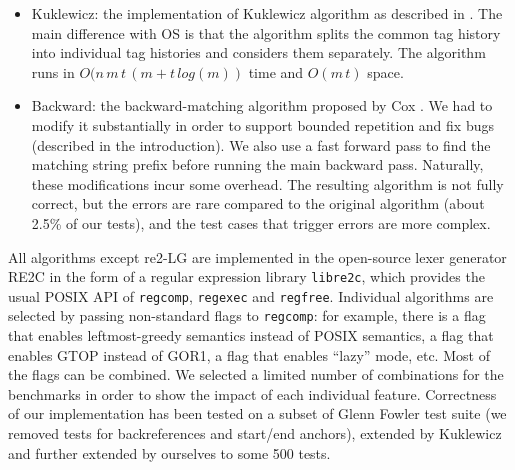 \documentclass[AMA,STIX1COL]{WileyNJD-v2}
\begin{document}
\begin{itemize}[itemsep=0.2em, topsep=0.5em]
\item Kuklewicz: the implementation of Kuklewicz algorithm \cite{Kuk07} as described in \cite{Tro17}.
    The main difference with OS is that the algorithm splits the common tag history into individual tag histories and considers them separately.
    The algorithm runs in $O(n \, m \, t \, (m + t \, log(m))$ time and $O(m \, t)$ space.

\item Backward: the backward-matching algorithm proposed by Cox \cite{Cox09}.
    We had to modify it substantially in order to support bounded repetition and fix bugs (described in the introduction).
    We also use a fast forward pass to find the matching string prefix before running the main backward pass.
    Naturally, these modifications incur some overhead.
    The resulting algorithm is not fully correct, but the errors are rare compared to the original algorithm (about 2.5\% of our tests),
    and the test cases that trigger errors are more complex.
\\[-0.5em]
\end{itemize}

All algorithms except re2-LG are implemented in the open-source lexer generator RE2C \cite{RE2C}
in the form of a regular expression library \texttt{libre2c},
which provides the usual POSIX API of \texttt{regcomp}, \texttt{regexec} and \texttt{regfree}.
Individual algorithms are selected by passing non-standard flags to \texttt{regcomp}:
for example, there is a flag that enables leftmost-greedy semantics instead of POSIX semantics,
a flag that enables GTOP instead of GOR1,
a flag that enables ``lazy'' mode, etc.
Most of the flags can be combined.
We selected a limited number of combinations for the benchmarks
in order to show the impact of each individual feature.
Correctness of our implementation has been tested on a subset of Glenn Fowler test suite \cite{Fow03}
(we removed tests for backreferences and start/end anchors),
extended by Kuklewicz and further extended by ourselves to some 500 tests.
\\

 \datatableX
\pgfplotstabletranspose{\datatable}{\datatableX}

\def\plotheight{1.5in}
\def\plotshift{\linewidth/5*3}
\end{document}

